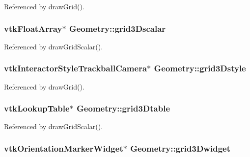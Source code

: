 Referenced by draw\-Grid().

\hypertarget{classGeometry_a3516628b6f6b85e9d0e025a768e6bd59}{
\subsubsection[{grid3\-Dscalar}]{\setlength{\rightskip}{0pt plus 5cm}vtk\-Float\-Array$\ast$ Geometry\-::grid3\-Dscalar\hspace{0.3cm}{\ttfamily [protected]}}}\label{classGeometry_a3516628b6f6b85e9d0e025a768e6bd59}


Referenced by draw\-Grid\-Scalar().

\hypertarget{classGeometry_aac1ed80d797b14f337a0e9d3206c70c7}{
\subsubsection[{grid3\-Dstyle}]{\setlength{\rightskip}{0pt plus 5cm}vtk\-Interactor\-Style\-Trackball\-Camera$\ast$ Geometry\-::grid3\-Dstyle\hspace{0.3cm}{\ttfamily [protected]}}}\label{classGeometry_aac1ed80d797b14f337a0e9d3206c70c7}


Referenced by draw\-Grid().

\hypertarget{classGeometry_ac1594e947b2efc680e2fb82c39a554d9}{
\subsubsection[{grid3\-Dtable}]{\setlength{\rightskip}{0pt plus 5cm}vtk\-Lookup\-Table$\ast$ Geometry\-::grid3\-Dtable\hspace{0.3cm}{\ttfamily [protected]}}}\label{classGeometry_ac1594e947b2efc680e2fb82c39a554d9}


Referenced by draw\-Grid\-Scalar().

\hypertarget{classGeometry_ad2e8316d21178ddc0b9f1e163cf8683b}{
\subsubsection[{grid3\-Dwidget}]{\setlength{\rightskip}{0pt plus 5cm}vtk\-Orientation\-Marker\-Widget$\ast$ Geometry\-::grid3\-Dwidget\hspace{0.3cm}{\ttfamily [protected]}}}\label{classGeometry_ad2e8316d21178ddc0b9f1e163cf8683b}



